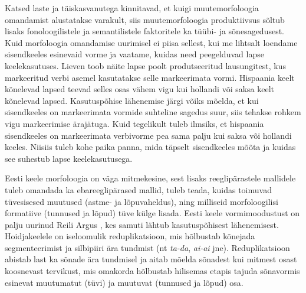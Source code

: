 \documentclass[12pt]{article}
\begin{document}
Katsed laste ja täiskasvanutega kinnitavad, et kuigi muutemorfoloogia omandamist alustatakse varakult, siis muutemorfoloogia produktiivsus sõltub lisaks fonoloogilistele ja semantilistele faktoritele ka tüübi- ja sõnesagedusest. Kuid morfoloogia omandamise uurimisel ei piisa sellest, kui me lihtsalt loendame sisendkeeles esinevaid vorme ja vaatame, kuidas need peegelduvad lapse keelekasutuses. Lieven toob näite lapse poolt produtseeritud lausungitest, kus markeeritud verbi asemel kasutatakse selle markeerimata vormi. Hispaania keelt kõnelevad lapsed teevad selles osas vähem vigu kui hollandi või saksa keelt kõnelevad lapsed. Kasutuspõhise lähenemise järgi võiks mõelda, et kui sisendkeeles on markeerimata vormide suhteline sagedus suur, siis tehakse rohkem vigu markeerimise ärajätuga. Kuid tegelikult tuleb ilmsiks, et hispaania sisendkeeles on markeerimata verbivorme pea sama palju kui saksa või hollandi keeles. Niisiis tuleb kohe paika panna, mida täpselt sisendkeeles mõõta ja kuidas see suhestub lapse keelekasutusega. \citep[2552--2554]{LIEVEN}

Eesti keele morfoloogia on väga mitmekesine, sest lisaks reeglipärastele mallidele tuleb omandada ka ebareeglipärased mallid, tuleb teada, kuidas toimuvad tüvesisesed muutused (astme- ja lõpuvaheldus), ning milliseid morfoloogilisi formatiive (tunnused ja lõpud) tüve külge lisada. Eesti keele vormimoodustust on palju uurinud Reili Argus \citep{ARGUSdiss}, kes samuti lähtub kasutuspõhisest lähenemisest. Hoidjakeelele on iseloomulik reduplikatsioon, mis hõlbustab kõnejada segmenteerimist ja silbipiiri ära tundmist (nt \emph{ta-da}, \emph{ai-ai} jne). Reduplikatsioon abistab last ka sõnade ära tundmisel ja aitab mõelda sõnadest kui mitmest osast koosnevast tervikust, mis omakorda hõlbustab hilisemas etapis tajuda sõnavormis esinevat muutumatut (tüvi) ja muutuvat (tunnused ja lõpud) osa. \citep[19--20]{ARGUSdiss}
\end{document}

